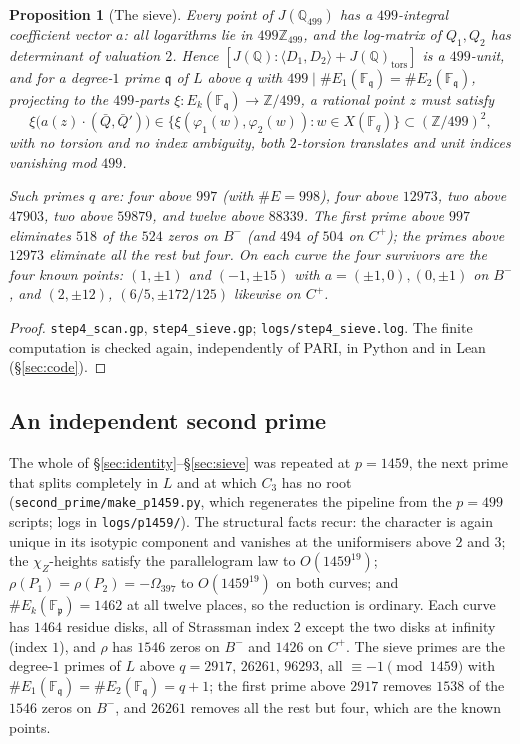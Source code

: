 \documentclass[11pt,reqno]{amsart}
\theoremstyle{plain}
\newtheorem{proposition}[theorem]{Proposition}
\theoremstyle{definition}
\newcommand{\Q}{\mathbb{Q}}
\newcommand{\Z}{\mathbb{Z}}
\newcommand{\FF}{\mathbb{F}}
\newcommand{\pp}{\mathfrak{p}}
\newcommand{\qq}{\mathfrak{q}}
\newcommand{\tors}{\mathrm{tors}}
\numberwithin{equation}{section}
\begin{document}
\begin{proposition}[The sieve]\label{prop:sieve}
Every point of $J(\Q_{499})$ has a $499$-integral coefficient vector $a$: all
logarithms lie in $499\Z_{499}$, and the log-matrix of $Q_{1},Q_{2}$ has
determinant of valuation $2$. Hence
$[J(\Q):\langle D_{1},D_{2}\rangle+J(\Q)_{\tors}]$ is a $499$-unit, and for a
degree-$1$ prime $\qq$ of $L$ above $q$ with
$499\mid\#E_{1}(\FF_{\qq})=\#E_{2}(\FF_{\qq})$, projecting to the $499$-parts
$\xi\colon E_{k}(\FF_{\qq})\to\Z/499$, a rational point $z$ must satisfy
\[
  \xi\bigl(a(z)\cdot(\bar Q,\bar Q')\bigr)
   \in\bigl\{\xi(\varphi_{1}(w),\varphi_{2}(w)) : w\in X(\FF_{q})\bigr\}
   \subset(\Z/499)^{2},
\]
with no torsion and no index ambiguity, both $2$-torsion translates and unit
indices vanishing mod $499$.

Such primes $q$ are: four above $997$ (with $\#E=998$), four above $12973$, two
above $47903$, two above $59879$, and twelve above $88339$. The first prime above
$997$ eliminates $518$ of the $524$ zeros on $B^{-}$ (and $494$ of $504$ on
$C^{+}$); the primes above $12973$ eliminate all the rest but four. On each
curve the four survivors are the four known points: $(1,\pm1)$ and $(-1,\pm15)$
with $a=(\pm1,0),(0,\pm1)$ on $B^{-}$, and $(2,\pm12)$, $(6/5,\pm172/125)$
likewise on $C^{+}$.
\end{proposition}

\begin{proof}
\texttt{step4\_scan.gp}, \texttt{step4\_sieve.gp}; \texttt{logs/step4\_sieve.log}.
The finite computation is checked again, independently of PARI, in Python and
in Lean (\S\ref{sec:code}).
\end{proof}

\subsection{An independent second prime}

The whole of \S\ref{sec:identity}--\S\ref{sec:sieve} was repeated at $p=1459$,
the next prime that splits completely in $L$ and at which $C_{3}$ has no root
(\texttt{second\_prime/\allowbreak make\_p1459.py}, which regenerates the
pipeline from the $p=499$ scripts; logs in \texttt{logs/p1459/}). The structural
facts recur: the
character is again unique in its isotypic component and vanishes at the
uniformisers above $2$ and $3$; the $\chi_{Z}$-heights satisfy the parallelogram
law to $O(1459^{19})$; $\rho(P_{1})=\rho(P_{2})=-\Omega_{397}$ to
$O(1459^{19})$ on both curves; and $\#E_{k}(\FF_{\pp})=1462$ at all twelve
places, so the reduction is ordinary. Each curve has $1464$ residue disks, all of
Strassman index $2$ except the two disks at infinity (index $1$), and $\rho$ has
$1546$ zeros on $B^{-}$ and $1426$ on $C^{+}$. The sieve primes are the degree-$1$
primes of $L$ above $q=2917,\,26261,\,96293$, all $\equiv-1\pmod{1459}$ with
$\#E_{1}(\FF_{\qq})=\#E_{2}(\FF_{\qq})=q+1$; the first prime above $2917$
removes $1538$ of the $1546$ zeros on $B^{-}$, and $26261$ removes all the rest
but four, which are the known points.
\end{document}
